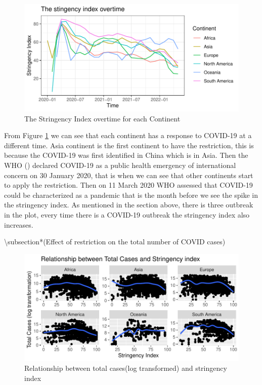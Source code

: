 \documentclass[11pt,a4paper,]{article}
\begin{document}
\begin{figure}

{\centering \includegraphics{report_files/figure-latex/stringency-index-1} 

}

\caption{The Stringency Index overtime for each Continent}\label{fig:stringency-index}
\end{figure}

From Figure \ref{fig:stringency-index} we can see that each continent has a response to COVID-19 at a different time. Asia continent is the first continent to have the restriction, this is because the COVID-19 was first identified in China which is in Asia. Then the WHO (\textcite{who}) declared COVID-19 as a public health emergency of international concern on 30 January 2020, that is when we can see that other continents start to apply the restriction. Then on 11 March 2020 WHO assessed that COVID-19 could be characterized as a pandemic that is the month before we see the spike in the stringency index. As mentioned in the section above, there is three outbreak in the plot, every time there is a COVID-19 outbreak the stringency index also increases.

\textbackslash subsection*(Effect of restriction on the total number of COVID cases)

\begin{figure}

{\centering \includegraphics{report_files/figure-latex/relationship-tot-index-1} 

}

\caption{Relationship between total cases(log transformed) and stringency index}\label{fig:relationship-tot-index}
\end{figure}
\end{document}
